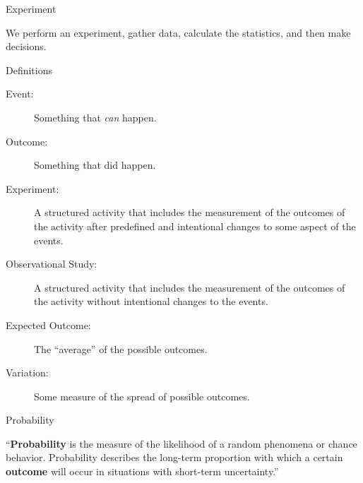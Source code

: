 \begin{frame}{Experiment}

  We perform an experiment, gather data, calculate the statistics, and
  then make decisions. 

  \vfill


  \vfill
  
\end{frame}



\begin{frame}{Definitions}

  \begin{description}
  \item[Event:] Something that \textit{can} happen.
  \item[Outcome:] Something that did happen.
  \item[Experiment:] A structured activity that includes the
    measurement of the outcomes of the activity after predefined and
    intentional changes to some aspect of the events.
  \item[Observational Study:] A structured activity that includes the
    measurement of the outcomes of the activity without intentional
    changes to the events.
  \item[Expected Outcome:] The ``average'' of the possible outcomes.
  \item[Variation:] Some measure of the spread of possible outcomes.
  \end{description}
  
\end{frame}


\begin{frame}{Probability}

  \begin{definition}[Probability]
    ``\textbf{Probability} is the measure of the likelihood of a random
    phenomena or chance behavior. Probability describes the long-term
    proportion with which a certain \textbf{outcome} will occur in
    situations with short-term uncertainty.'' 
  \end{definition}

  
\end{frame}



